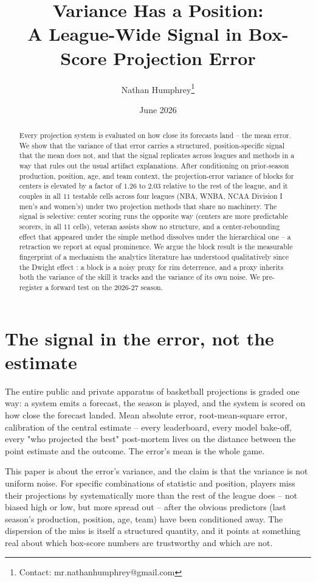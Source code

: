 \documentclass[11pt]{article}
\title{Variance Has a Position:\\ \large{A League-Wide Signal in Box-Score Projection Error}}
\author{Nathan Humphrey\thanks{Contact: mr.nathanhumphrey@gmail.com}} \affil{Independent Researcher; Annapolis, MD\\ ORCID: 0009-0004-8512-4105}
\date{June 2026}
\begin{document}
\maketitle

\begin{abstract}
\noindent
Every projection system is evaluated on how close its forecasts land -- the mean error. We show that the variance of that error carries a structured, position-specific signal that the mean does not, and that the signal replicates across leagues and methods in a way that rules out the usual artifact explanations. After conditioning on prior-season production, position, age, and team context, the projection-error variance of blocks for centers is elevated by a factor of $1.26$ to $2.03$ relative to the rest of the league, and it couples in all $11$ testable cells across four leagues (NBA, WNBA, NCAA Division I men's and women's) under two projection methods that share no machinery. The signal is selective: center scoring runs the opposite way (centers are more predictable scorers, in all $11$ cells), veteran assists show no structure, and a center-rebounding effect that appeared under the simple method dissolves under the hierarchical one -- a retraction we report at equal prominence. We argue the block result is the measurable fingerprint of a mechanism the analytics literature has understood qualitatively since the Dwight effect \citep{goldsberry2013dwight}: a block is a noisy proxy for rim deterrence, and a proxy inherits both the variance of the skill it tracks and the variance of its own noise. We pre-register a forward test on the 2026-27 season.
\end{abstract}

\section{The signal in the error, not the estimate}\label{sec-signal}
The entire public and private apparatus of basketball projections is graded one way: a system emits a forecast, the season is played, and the system is scored on how close the forecast landed. Mean absolute error, root-mean-square error, calibration of the central estimate -- every leaderboard, every model bake-off, every "who projected the best" post-mortem lives on the distance between the point estimate and the outcome. The error's mean is the whole game.

This paper is about the error's variance, and the claim is that the variance is not uniform noise. For specific combinations of statistic and position, players miss their projections by systematically more than the rest of the league does -- not biased high or low, but more spread out -- after the obvious predictors (last season's production, position, age, team) have been conditioned away. The dispersion of the miss is itself a structured quantity, and it points at something real about which box-score numbers are trustworthy and which are not.
\end{document}
